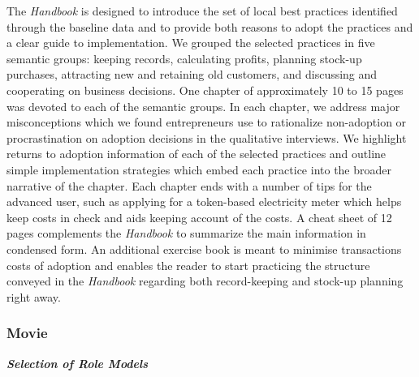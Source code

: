 \documentclass[11.5pt]{article}
\begin{document}
{The \emph{Handbook} is designed to introduce the set of local best practices identified through the baseline data and to provide both reasons to adopt the practices and a clear guide to implementation. We grouped the selected practices in five semantic groups: keeping records, calculating profits, planning stock-up purchases, attracting new and retaining old customers, and discussing and cooperating on business decisions. One chapter of approximately 10 to 15 pages was devoted to each of the semantic groups. In each chapter, we address major misconceptions which we found entrepreneurs use to rationalize non-adoption or procrastination on adoption decisions in the qualitative interviews. We highlight returns to adoption information of each of the selected practices and outline simple implementation strategies which embed each practice into the broader narrative of the chapter. %
Each chapter ends with a number of tips for the advanced user, such as applying for a token-based electricity meter which helps keep costs in check and aids keeping account of the costs. %
A cheat sheet of 12 pages complements the \emph{Handbook} to summarize the main information in condensed form. An additional exercise book is meant to minimise transactions costs of adoption and enables the reader to start practicing the structure conveyed in the \emph{Handbook} regarding both record-keeping and stock-up planning right away.

\subsubsection{Movie}

\emph{\textbf{Selection of Role Models}}\

}
\end{document}
